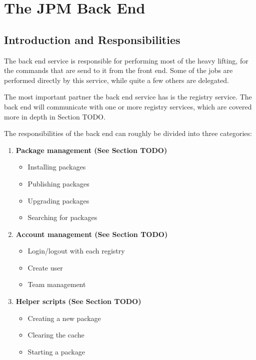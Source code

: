 \section{The JPM Back End}

\subsection{Introduction and Responsibilities}

The back end service is responsible for performing most of the heavy lifting,
for the commands that are send to it from the front end. Some of the jobs
are performed directly by this service, while quite a few others are
delegated.

The most important partner the back end service has is the registry service.
The back end will communicate with one or more registry services, which are
covered more in depth in Section TODO.

The responsibilities of the back end can roughly be divided into three
categories:

\begin{enumerate}
\item \textbf{Package management (See Section TODO)}
    \begin{itemize}
        \item Installing packages
        \item Publishing packages
        \item Upgrading packages
        \item Searching for packages
    \end{itemize}
\item \textbf{Account management (See Section TODO)}
    \begin{itemize}
        \item Login/logout with each registry
        \item Create user
        \item Team management
    \end{itemize}
\item \textbf{Helper scripts (See Section TODO)}
    \begin{itemize}
        \item Creating a new package
        \item Clearing the cache
        \item Starting a package
    \end{itemize}
\end{enumerate}

